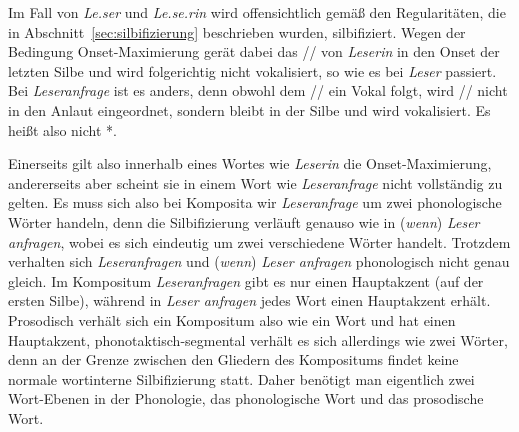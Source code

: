 \begin{exe}
  \ex\label{ex:phol8945}
  \begin{xlist}
  \end{xlist}
\end{exe}

Im Fall von \textit{Le.ser} und \textit{Le.se.rin} wird offensichtlich gemäß den Regularitäten, die in Abschnitt~\ref{sec:silbifizierung} beschrieben wurden, silbifiziert.
Wegen der Bedingung Onset-Maximierung gerät dabei das // von \textit{Leserin} in den Onset der letzten Silbe und wird folgerichtig nicht vokalisiert, so wie es bei \textit{Leser} passiert.
Bei \textit{Leseranfrage} ist es anders, denn obwohl dem // ein Vokal folgt, wird // nicht in den Anlaut eingeordnet, sondern bleibt in der Silbe \textipa{[z5]} und wird vokalisiert.
Es heißt also nicht *.

Einerseits gilt also innerhalb eines Wortes wie \textit{Leserin} die Onset-Maximierung, andererseits aber scheint sie in einem Wort wie \textit{Leseranfrage} nicht vollständig zu gelten.
Es muss sich also bei Komposita wir \textit{Leseranfrage} um zwei phonologische Wörter handeln, denn die Silbifizierung verläuft genauso wie in (\textit{wenn}) \textit{Leser anfragen}, wobei es sich eindeutig um zwei verschiedene Wörter handelt.
Trotzdem verhalten sich \textit{Leseranfragen} und (\textit{wenn}) \textit{Leser anfragen} phonologisch nicht genau gleich.
Im Kompositum \textit{Leseranfragen} gibt es nur einen Hauptakzent (auf der ersten Silbe), während in \textit{Leser anfragen} jedes Wort einen Hauptakzent erhält.
Prosodisch verhält sich ein Kompositum also wie ein Wort und hat einen Hauptakzent, phonotaktisch-segmental verhält es sich allerdings wie zwei Wörter, denn an der Grenze zwischen den Gliedern des Kompositums findet keine normale wortinterne Silbifizierung statt.
Daher benötigt man eigentlich zwei Wort-Ebenen in der Phonologie, das phonologische Wort und das prosodische Wort.


